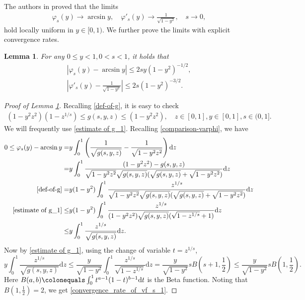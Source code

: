 \documentclass[reqno,10pt]{amsart}
\let\vf=\varphi
\newcommand{\ben}{\begin{eqnarray}}
\newcommand{\een}{\end{eqnarray}}
\newcommand{\beno}{\begin{eqnarray*}}
\newcommand{\eeno}{\end{eqnarray*}}
\newtheorem{lem}{Lemma}[section]
\theoremstyle{definition}
\numberwithin{equation}{section}
\begin{document}
The authors in \cite{Jang2023-df} proved that the limits 
\beno 
\vf_s(y)\to \arcsin y, \quad \vf'_s(y)\to \frac{1}{\sqrt{1-y^2}}, \quad s\to 0,
\eeno 
 hold locally uniform in $y\in [0,1)$. We further prove the limits with 
explicit convergence rates.
\begin{lem} \label{diff-varphi-and-limit}
  For any  $0 \leq y <  1, 0<s<1$, it holds that
    \ben \label{convergence_rate_of_vf_s_1}
    |\vf_s(y)-\arcsin y|\leq 2sy (1-y^2)^{-1/2},
    \\ \label{convergence_rate_of_derivative_vf_s}
    |\vf'_s(y)-\frac{1}{\sqrt{1-y^2}}|\leq 2s (1-y^2)^{-3/2}.
    \een
\end{lem}
\begin{proof}[Proof of Lemma \ref{diff-varphi-and-limit}] Recalling \eqref{def-of-g},
	it is easy to check 
	\ben\label{estimate of g_1}
	(1-y^{2}z^2)(1-z^{1/s})\leq g(s,y,z) \leq (1-y^{2}z^2), \quad z\in[0,1],y\in[0,1], s\in(0,1].
	\een
	We will frequently use \eqref{estimate of g_1}.
     Recalling \eqref{comparison-varphi},
    we have
\beno
    \begin{aligned}
   0\le\vf_s(y)-\arcsin y =     &y\int_{0}^{1} \left(\frac{1}{\sqrt{g(s,y,z)}}-\frac{1}{\sqrt{1-y^{2}z^{2}}} \right)\mathrm{d}z \\
        = &
        y\int_{0}^{1}\frac{(1-y^{2}z^{2})-g(s,y,z)}{\sqrt{1-y^{2}z^{2}}\sqrt{g(s,y,z)}(\sqrt{g(s,y,z)}+\sqrt{1-y^{2}z^{2}})}\mathrm{d}z\\  \eqref{def-of-g}
        = & y(1-y^{2})\int_{0}^{1}\frac{z^{1/s}}{\sqrt{1-y^{2}z^{2}}\sqrt{g(s,y,z)}(\sqrt{g(s,y,z)}+\sqrt{1-y^{2}z^{2}})}\mathrm{d}z\\
        \eqref{estimate of g_1}\leq & y(1-y^2)\int_{0}^{1}\frac{z^{1/s}}{(1-y^{2}z^{2})\sqrt{g(s,y,z)}(\sqrt{1-z^{1/s}}+1)}\mathrm{d}z\\
        \leq &
        y\int_{0}^{1}\frac{z^{1/s}}{\sqrt{g(s,y,z)}}\mathrm{d}z.
    \end{aligned}
 \eeno
   Now  by \eqref{estimate of g_1}, using the change of variable $t=z^{1/s}$,
    $$ y\int_{0}^{1}\frac{z^{1/s}}{\sqrt{g(s,y,z)}}\mathrm{d}z\leq \frac{y}{\sqrt{1-y^2}}\int_{0}^{1}\frac{z^{1/s}}{\sqrt{1-z^{1/s}}}\mathrm{d}z=\frac{y}{\sqrt{1-y^2}}sB(s+1,\frac{1}{2})\le\frac{y}{\sqrt{1-y^2}}sB(1,\frac{1}{2}).$$
    Here $B(a,b) \colonequals \int_{0}^{1}  t^{a-1} (1-t)^{b-1} \mathrm{d} t$ is the Beta function.
    Noting that $B(1,\frac{1}{2})=2$, we get \eqref{convergence_rate_of_vf_s_1}. 
    

\end{proof}
\end{document}
